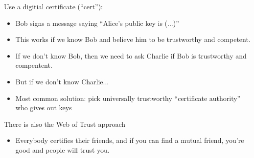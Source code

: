 \begin{itemize}
        Use a digitial certificate (``cert''):
        \begin{itemize}
            \item Bob signs a message saying ``Alice's public key is (...)''
            \item This works if we know Bob and believe him to be trustworthy
                and competent.
            \item If we don't know Bob, then we need to ask Charlie if Bob is
                trustworthy and compentent.
            \item But if we don't know Charlie...
            \item Most common solution: pick universally trustworthy
                ``certificate authority'' who gives out keys\\
        \end{itemize}

        There is also the Web of Trust approach
        \begin{itemize}
            \item Everybody certifies their friends, and if you can find a mutual 
                friend, you're good and people will trust you.
        \end{itemize}
\end{itemize}
